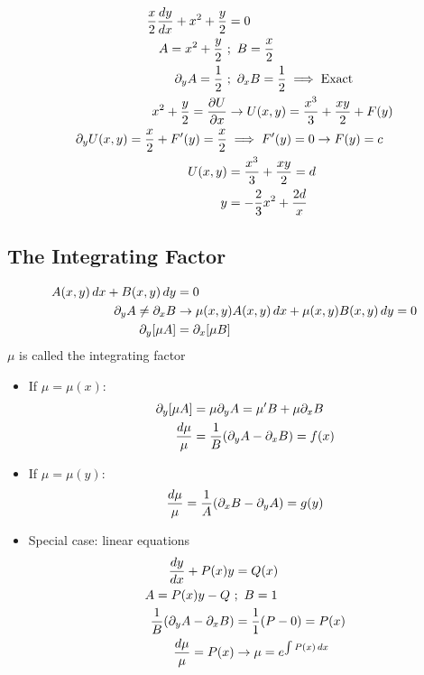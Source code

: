 \documentclass[Maths.tex]{subfiles}
\begin{document}
\begin{example}
    \begin{align*}
        \frac{x}{2}\frac{dy}{dx} + x^2 + \frac{y}{2} &= 0 \\
        A = x^2 + \frac{y}{2} ~&;~ B = \frac{x}{2} \\
        \partial_yA = \frac{1}{2} ~&;~ \partial_xB = \frac{1}{2} \implies \text{Exact} \\
        x^2 + \frac{y}{2} = \frac{\partial U}{\partial x} &\to U(x,y) = \frac{x^3}{3} + \frac{xy}{2} + F(y) \\
        \partial_yU(x,y) = \frac{x}{2} + F'(y) = \frac{x}{2} &\implies F'(y) = 0 \to F(y) = c \\
        U(x,y) &= \frac{x^3}{3} + \frac{xy}{2} = d \\
        y &= -\frac{2}{3}x^2 + \frac{2d}{x}
    \end{align*}
\end{example}

\subsection{The Integrating Factor}
\begin{align*}
    A(x,y)\,dx + B(x,y)\,dy &= 0 \\
    \partial_yA \neq \partial_xB &\to \mu(x,y)A(x,y)\,dx + \mu(x,y)B(x,y)\,dy = 0 \\
    \partial_y[\mu A] &= \partial_x[\mu B]
\end{align*}
$\mu$ is called the integrating factor
\begin{itemize}
    \item If $\mu = \mu(x)$:
        \begin{align*}
            \partial_y[\mu A] &= \mu \partial_yA = \mu'B + \mu\partial_xB \\
            \frac{d\mu}{\mu} &= \frac{1}{B}(\partial_yA - \partial_xB) = f(x)
        \end{align*}
    \item If $\mu = \mu(y)$:
        \begin{equation*}
            \frac{d\mu}{\mu} = \frac{1}{A}(\partial_xB - \partial_yA) = g(y)
        \end{equation*}
    \item Special case: linear equations
        \begin{align*}
            \frac{dy}{dx} + P(x)y &= Q(x) \\
            A = P(x)y - Q ~&;~ B = 1 \\
            \frac{1}{B}(\partial_yA - \partial_xB) &= \frac{1}{1}(P - 0) = P(x) \\
            \frac{d\mu}{\mu} = P(x) &\to \mu = e^{\int P(x)\,dx}
        \end{align*}
\end{itemize}
\end{document}
